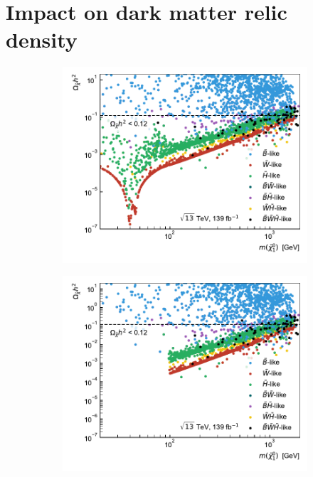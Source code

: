 \section{Impact on dark matter relic density}


\begin{figure}
	\centering
	\begin{subfigure}[b]{0.49\linewidth}
		\centering\includegraphics[width=\textwidth]{scatter/relic_density_lsp}
		\caption{\label{fig:relic_density_lsp_no_constraint}}
	\end{subfigure}\hfill
	\begin{subfigure}[b]{0.49\linewidth}
		\centering\includegraphics[width=\textwidth]{scatter/relic_density_lsp_limits}

\end{subfigure}
\end{figure}
